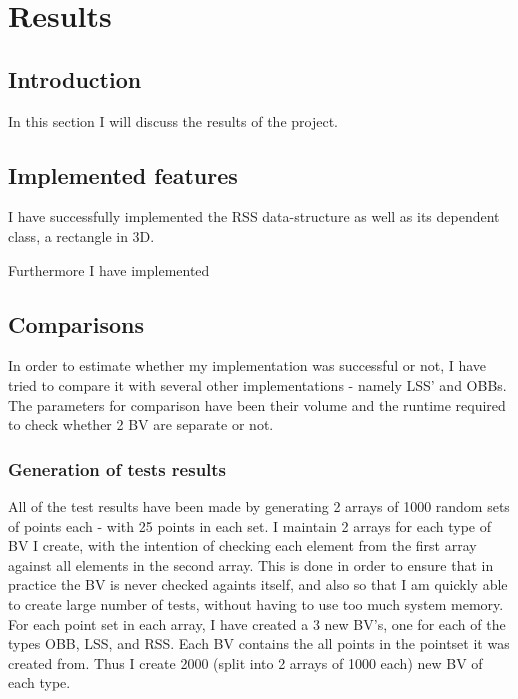 
\section{Results}
\label{results}
\subsection{Introduction}
In this section I will discuss the results of the project.

\subsection{Implemented features}
I have successfully implemented the RSS data-structure as well as its dependent class, a rectangle in 3D. 

Furthermore I have implemented

\subsection{Comparisons}

In order to estimate whether my implementation was successful or not, I have tried to compare it with several other implementations - namely LSS' and OBBs. The parameters for comparison have been their volume and the runtime required to check whether 2 BV are separate or not.

\subsubsection{Generation of tests results}
All of the test results have been made by generating 2 arrays of
1000 random sets of points each - with 25 points in each set. I
maintain 2 arrays for each type of BV I create, with the intention of
checking each element from the first array against all elements in the
second array. This is done in order to ensure
that in practice the BV is never checked againts itself, and also so
that I am quickly able to create large number of tests, without having
to use too much system memory. \\ 

For each point set in each array, I have created a 3 new BV's, one for
each of the types OBB, LSS, and RSS. Each BV contains the all points
in the pointset it was created from. Thus I create 2000 (split into 2 arrays of 1000 each)
new BV of each type. \\ 

